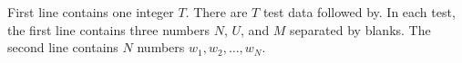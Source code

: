 First line contains one integer $T$. 
There are $T$ test data followed by.
In each test, the first line contains three numbers $N$, $U$, and $M$ 
separated by blanks. 
The second line contains $N$ numbers $w_1,w_2,\ldots,w_N$.
